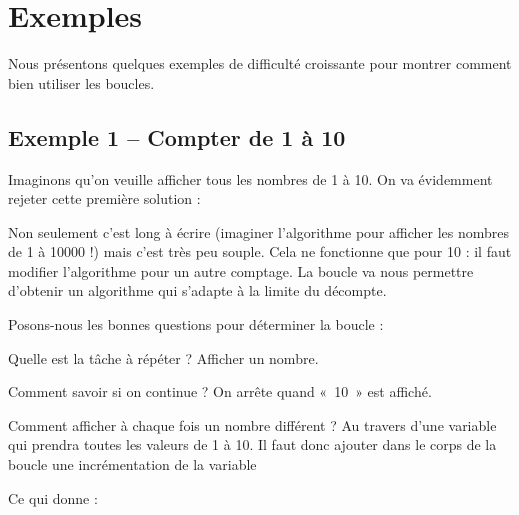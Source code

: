 \section{Exemples}

	Nous présentons quelques exemples de difficulté
	croissante pour montrer comment bien utiliser les boucles.

	\subsection{Exemple 1 -- Compter de 1 à 10}

		Imaginons qu'on veuille afficher tous les nombres de 1 à 10. 
		On va évidemment rejeter cette première solution :


		Non seulement c'est long à écrire 
		(imaginer l'algorithme pour afficher les nombres de 1 à 10000 !) 
		mais c'est très peu souple.
		Cela ne fonctionne que pour 10 : il faut modifier l'algorithme pour
		un autre comptage. La boucle va nous permettre
		d'obtenir un algorithme qui s'adapte
		à la limite du décompte.

		Posons-nous les bonnes questions pour déterminer la boucle :

		\begin{liste}
		\item 
			Quelle est la tâche à répéter ? Afficher un nombre.
		\item 
			Comment savoir si on continue ? On arrête quand «~10~» est affiché.
		\item 
			Comment afficher à chaque fois un nombre différent ? 
			Au travers d'une variable qui prendra toutes les valeurs de 1 à 10. 
			Il faut donc ajouter dans le corps de la
			boucle une incrémentation de la variable
		\end{liste}

		Ce qui donne :


